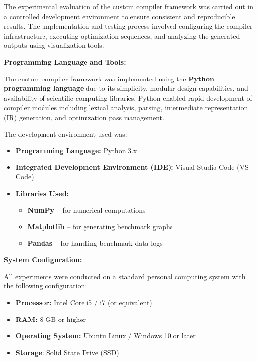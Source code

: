 \documentclass[conference]{IEEEtran}
\begin{document}
The experimental evaluation of the custom compiler framework was carried out in a controlled development environment to ensure consistent and reproducible results. The implementation and testing process involved configuring the compiler infrastructure, executing optimization sequences, and analyzing the generated outputs using visualization tools.

\textbf{Programming Language and Tools:}

The custom compiler framework was implemented using the \textbf{Python programming language} due to its simplicity, modular design capabilities, and availability of scientific computing libraries. Python enabled rapid development of compiler modules including lexical analysis, parsing, intermediate representation (IR) generation, and optimization pass management.

The development environment used was:

\begin{itemize}

\item \textbf{Programming Language:} Python 3.x  
\item \textbf{Integrated Development Environment (IDE):} Visual Studio Code (VS Code)  
\item \textbf{Libraries Used:}
    \begin{itemize}
        \item \textbf{NumPy} – for numerical computations
        \item \textbf{Matplotlib} – for generating benchmark graphs
        \item \textbf{Pandas} – for handling benchmark data logs
    \end{itemize}

\end{itemize}

\textbf{System Configuration:}

All experiments were conducted on a standard personal computing system with the following configuration:

\begin{itemize}

\item \textbf{Processor:} Intel Core i5 / i7 (or equivalent)
\item \textbf{RAM:} 8 GB or higher
\item \textbf{Operating System:} Ubuntu Linux / Windows 10 or later
\item \textbf{Storage:} Solid State Drive (SSD)

\end{itemize}
\end{document}
